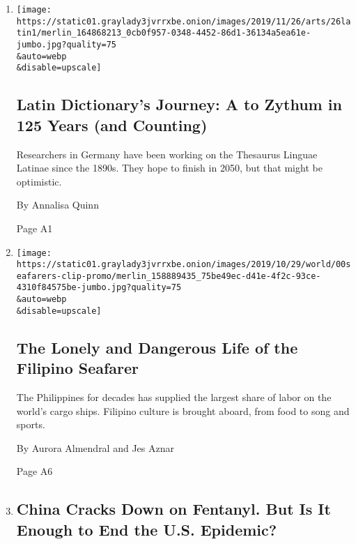 \begin{enumerate}
\def\labelenumi{\arabic{enumi}.}
\item
  \href{/2019/11/30/arts/latin-dictionary.html}{}

  \texttt{[image: https://static01.graylady3jvrrxbe.onion/images/2019/11/26/arts/26latin1/merlin\_164868213\_0cb0f957-0348-4452-86d1-36134a5ea61e-jumbo.jpg?quality=75\\\&auto=webp\\\&disable=upscale]}

  \hypertarget{latin-dictionarys-journey-a-to-zythum-in-125-years-and-counting}{%
  \subsection{Latin Dictionary's Journey: A to Zythum in 125 Years (and
  Counting)}\label{latin-dictionarys-journey-a-to-zythum-in-125-years-and-counting}}

  Researchers in Germany have been working on the Thesaurus Linguae
  Latinae since the 1890s. They hope to finish in 2050, but that might
  be optimistic.

  By Annalisa Quinn

  Page A1
\item
  \href{/2019/11/30/world/asia/philippines-mariners-cargo-ships.html}{}

  \texttt{[image: https://static01.graylady3jvrrxbe.onion/images/2019/10/29/world/00seafarers-clip-promo/merlin\_158889435\_75be49ec-d41e-4f2c-93ce-4310f84575be-jumbo.jpg?quality=75\\\&auto=webp\\\&disable=upscale]}

  \hypertarget{the-lonely-and-dangerous-life-of-the-filipino-seafarer}{%
  \subsection{The Lonely and Dangerous Life of the Filipino
  Seafarer}\label{the-lonely-and-dangerous-life-of-the-filipino-seafarer}}

  The Philippines for decades has supplied the largest share of labor on
  the world's cargo ships. Filipino culture is brought aboard, from food
  to song and sports.

  By Aurora Almendral and Jes Aznar

  Page A6
\item
  \href{/2019/12/01/world/asia/china-fentanyl-crackdown.html}{}

  \hypertarget{china-cracks-down-on-fentanyl-but-is-it-enough-to-end-the-us-epidemic}{%
  \subsection{China Cracks Down on Fentanyl. But Is It Enough to End the
  U.S.
  Epidemic?}\label{china-cracks-down-on-fentanyl-but-is-it-enough-to-end-the-us-epidemic}}


\end{enumerate}
